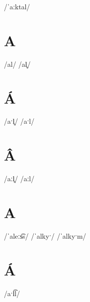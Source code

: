 \documentclass[10pt,a4paper,twoside]{book}
\begin{document}
\begin{multicols}{3}
 {/ˈaːktal/} {}
\end{multicols}

\section*{A}

\begin{multicols}{3}
 {/al/} {}
 {/al̥/} {}
\end{multicols}

\section*{Á}

\begin{multicols}{3}
 {/aˑl̥/} {}
 {/aˑl/} {}
\end{multicols}

\section*{Â}

\begin{multicols}{3}
 {/aːl̥/} {}
 {/aːl/} {}
\end{multicols}

\section*{A}

\begin{multicols}{3}
 {/ˈaleːs͡s/} {}
 {/ˈalkyˑ/} {}
 {/ˈalkyˑm/} {}
\end{multicols}

\section*{Á}

\begin{multicols}{3}
 {/aˑl͡l/} {}
\end{multicols}
\end{document}
